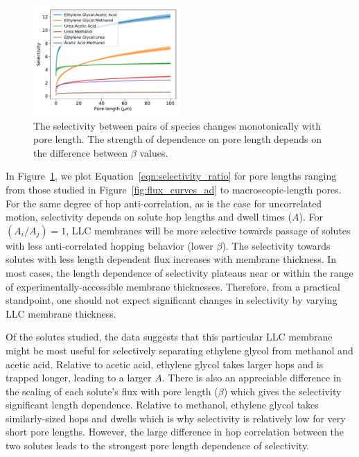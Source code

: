 \documentclass[journal=jctcce,manuscript=article]{achemso}
\begin{document}
  \begin{figure}
  \centering
  \includegraphics[width=0.5\textwidth]{selectivity.pdf}
  \caption{The selectivity between pairs of species changes monotonically with
	  pore length. The strength of dependence on pore length depends on
 	  the difference between $\beta$ values. 
  }
  \label{fig:selectivity}
  \end{figure}
   
  In Figure~\ref{fig:selectivity}, we plot Equation~\ref{eqn:selectivity_ratio}
  for pore lengths ranging from those studied in
  Figure~\ref{fig:flux_curves_ad} to macroscopic-length pores. For the same
  degree of hop anti-correlation, as is the case for uncorrelated motion,
  selectivity depends on solute hop lengths and dwell times ($A$). For $(A_i /
  A_j)=1$, LLC membranes will be more selective towards passage of solutes with
  less anti-correlated hopping behavior (lower $\beta$). The selectivity
  towards solutes with less length dependent flux increases with membrane
  thickness. In most cases, the length dependence of selectivity plateaus near
  or within the range of experimentally-accessible membrane thicknesses.
  Therefore, from a practical standpoint, one should not expect significant
  changes in selectivity by varying LLC membrane thickness. 
  
  Of the solutes studied, the data suggests that this particular LLC membrane 
  might be most useful for selectively separating ethylene glycol from methanol
  and acetic acid. Relative to acetic acid, ethylene glycol takes larger hops 
  and is trapped longer, leading to a larger $A$. There is also an appreciable 
  difference in the scaling of each solute's flux with pore length ($\beta$) 
  which gives the selectivity significant length dependence. Relative to methanol,
  ethylene glycol takes similarly-sized hops and dwells which is why selectivity
  is relatively low for very short pore lengths. However, the large difference in
  hop correlation between the two solutes leads to the strongest pore length 
  dependence of selectivity. 
  
\end{document}
